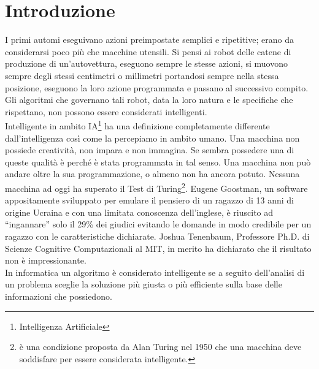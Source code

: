 \chapter*{Introduzione}
\fancyfoot[C]{\thepage } 
I primi automi eseguivano azioni preimpostate semplici e ripetitive; erano da considerarsi poco 
più che macchine utensili. Si pensi ai robot delle catene di produzione di un'autovettura, 
eseguono sempre le stesse azioni, si muovono sempre degli stessi centimetri o millimetri 
portandosi sempre nella stessa posizione, eseguono la loro azione programmata 
e passano al successivo compito. Gli algoritmi che governano tali robot, data la 
loro natura e le specifiche che rispettano, non possono essere considerati intelligenti.\\
Intelligente in ambito IA\footnote{Intelligenza Artificiale} ha una definizione completamente differente 
dall'intelligenza così come la percepiamo in ambito umano. Una macchina non 
possiede creatività, non impara e non immagina. Se sembra possedere una di queste 
qualità è perché è stata programmata in tal senso. Una macchina non può andare oltre 
la sua programmazione, o almeno non ha ancora potuto. Nessuna macchina ad oggi ha superato 
il Test di Turing\footnote{è una condizione proposta da Alan Turing nel 1950 
che una macchina deve soddisfare per essere considerata intelligente.}. Eugene 
Goostman, un software appositamente sviluppato per emulare il pensiero 
di un ragazzo di 13 anni di origine Ucraina e con una limitata conoscenza dell'inglese,
è riuscito ad ``ingannare'' solo il 29\% dei giudici evitando le domande in modo 
credibile per un ragazzo con le caratteristiche dichiarate. Joshua Tenenbaum,
Professore Ph.D. di Scienze Cognitive Computazionali al MIT, in merito ha dichiarato che 
il risultato non è impressionante.\cite{eugene}\\
In informatica un algoritmo è considerato intelligente
se a seguito dell'analisi di un problema sceglie la soluzione più giusta o più efficiente 
sulla base delle informazioni che possiedono.

